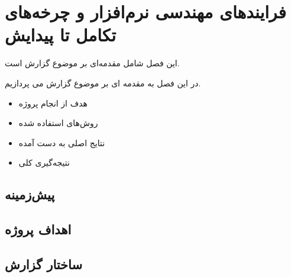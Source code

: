 \chapter{فرایندهای مهندسی نرم‌افزار و چرخه‌های تکامل تا پیدایش}
\label{ch:introduction}

این فصل شامل مقدمه‌ای بر موضوع گزارش است.

در این فصل به مقدمه ای بر موضوع گزارش می پردازیم.

\begin{itemize}
    \item هدف از انجام پروژه
    \item روش‌های استفاده شده
    \item نتایج اصلی به دست آمده
    \item نتیجه‌گیری کلی
\end{itemize}

\section{پیش‌زمینه}
\label{sec:ch1-background}


\section{اهداف پروژه}
\label{sec:ch1-objectives}


\section{ساختار گزارش}
\label{sec:ch1-structure}


